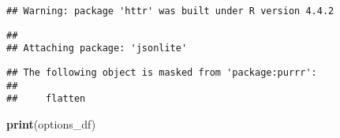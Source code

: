 \documentclass[
]{article}
\newenvironment{Shaded}{\begin{snugshade}}{\end{snugshade}}
\newcommand{\FunctionTok}[1]{\textcolor[rgb]{0.13,0.29,0.53}{\textbf{#1}}}
\newcommand{\NormalTok}[1]{#1}
\begin{document}
\begin{verbatim}
## Warning: package 'httr' was built under R version 4.4.2
\end{verbatim}

\begin{verbatim}
## 
## Attaching package: 'jsonlite'
\end{verbatim}

\begin{verbatim}
## The following object is masked from 'package:purrr':
## 
##     flatten
\end{verbatim}

\begin{Shaded}
\begin{Highlighting}[]
\FunctionTok{print}\NormalTok{(options\_df)}
\end{Highlighting}
\end{Shaded}
\end{document}
